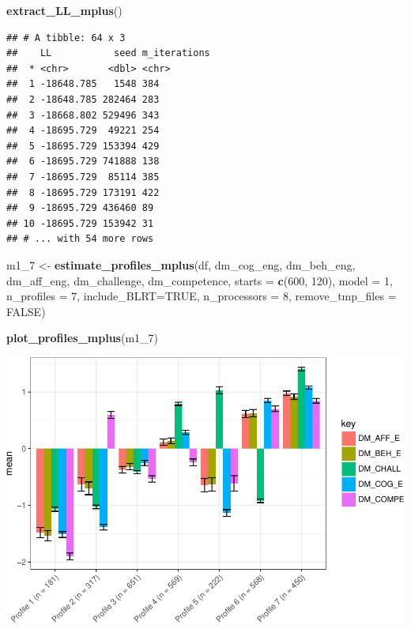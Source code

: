 \documentclass[]{msu-thesis}
\newenvironment{Shaded}{\begin{snugshade}}{\end{snugshade}}
\newcommand{\KeywordTok}[1]{\textcolor[rgb]{0.13,0.29,0.53}{\textbf{#1}}}
\newcommand{\DataTypeTok}[1]{\textcolor[rgb]{0.13,0.29,0.53}{#1}}
\newcommand{\DecValTok}[1]{\textcolor[rgb]{0.00,0.00,0.81}{#1}}
\newcommand{\StringTok}[1]{\textcolor[rgb]{0.31,0.60,0.02}{#1}}
\newcommand{\OtherTok}[1]{\textcolor[rgb]{0.56,0.35,0.01}{#1}}
\newcommand{\NormalTok}[1]{#1}
\theoremstyle{definition}
\theoremstyle{definition}
\theoremstyle{definition}
\theoremstyle{remark}
\begin{document}
\begin{Shaded}
\begin{Highlighting}[]
\KeywordTok{extract_LL_mplus}\NormalTok{()}
\end{Highlighting}
\end{Shaded}

\begin{verbatim}
## # A tibble: 64 x 3
##    LL           seed m_iterations
##  * <chr>       <dbl> <chr>       
##  1 -18648.785   1548 384         
##  2 -18648.785 282464 283         
##  3 -18668.802 529496 343         
##  4 -18695.729  49221 254         
##  5 -18695.729 153394 429         
##  6 -18695.729 741888 138         
##  7 -18695.729  85114 385         
##  8 -18695.729 173191 422         
##  9 -18695.729 436460 89          
## 10 -18695.729 153942 31          
## # ... with 54 more rows
\end{verbatim}

\begin{Shaded}
\begin{Highlighting}[]
\NormalTok{m1_}\DecValTok{7}\NormalTok{ <-}\StringTok{ }\KeywordTok{estimate_profiles_mplus}\NormalTok{(df,  }
\NormalTok{                             dm_cog_eng, dm_beh_eng, dm_aff_eng, dm_challenge, dm_competence,}
                             \DataTypeTok{starts =} \KeywordTok{c}\NormalTok{(}\DecValTok{600}\NormalTok{, }\DecValTok{120}\NormalTok{),}
                             \DataTypeTok{model =} \DecValTok{1}\NormalTok{,}
                             \DataTypeTok{n_profiles =} \DecValTok{7}\NormalTok{,}
                             \DataTypeTok{include_BLRT=}\OtherTok{TRUE}\NormalTok{,}
                             \DataTypeTok{n_processors =} \DecValTok{8}\NormalTok{, }\DataTypeTok{remove_tmp_files =} \OtherTok{FALSE}\NormalTok{)}

\KeywordTok{plot_profiles_mplus}\NormalTok{(m1_}\DecValTok{7}\NormalTok{)}
\end{Highlighting}
\end{Shaded}

\includegraphics{rosenberg-dissertation_files/figure-latex/spec-solutions-model1-5.pdf}
\end{document}
